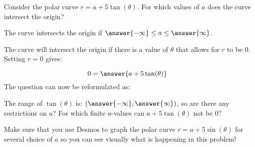 \documentclass{ximera}
\author{Jim Talamo}
\begin{document}
\begin{exercise}
Consider the polar curve $r = a+5\tan(\theta)$.  For which values of $a$ does the curve intersect the origin?

The curve intersects the origin if $\answer{-\infty} \leq a \leq \answer{\infty}$.

\begin{hint}
The curve will intersect the origin if there is a value of $\theta$ that allows for $r$ to be $0$.  Setting $r=0$ gives:

\[
0 = \answer{a+5 \tan(\theta)}
\]
The question can now be reformulated as: 
\begin{multipleChoice}
\end{multipleChoice}

The range of $\tan(\theta)$ is: $\left(\answer{-\infty},\answer{\infty}\right)$, so are there any restrictions on $a$?  For which finite $a$-values can $a+5 \tan(\theta)$ not be $0$?
\end{hint}

Make sure that you use Desmos to graph the polar curve $r = a+5\sin(\theta)$ for several choice of $a$ so you can see visually what is happening in this problem!

\end{exercise}
\end{document}
